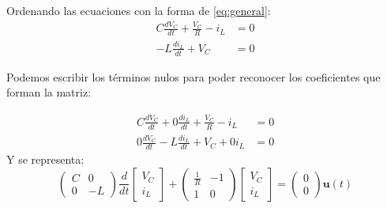 \documentclass[10pt,a4paper]{article} %
\begin{document}
	Ordenando las ecuaciones con la forma de \ref{eq:general}:
	\begin{align}
	C\frac{dV_C}{dt}+\frac{V_C}{R}-i_L&=0\\
	-L\frac{di_L}{dt}+V_C&=0		
	\end{align}
	
	Podemos escribir los términos nulos para poder reconocer los coeficientes que forman la matriz:
	
	\begin{align}
	C\frac{dV_C}{dt}+0\frac{di_L}{dt}+\frac{V_C}{R}-i_L&=0\\
	0\frac{dV_C}{dt}-L\frac{di_L}{dt}+V_C+0i_L&=0		
	\end{align}
	Y se representa:
	\begin{equation}
	\begin{pmatrix}
	C&0\\
	0&-L
	\end{pmatrix}\frac{d}{dt}\begin{bmatrix}
	V_C\\
	i_L
	\end{bmatrix}+\begin{pmatrix}
	\frac{1}{R} & -1\\
	1&0
	\end{pmatrix}\begin{bmatrix}
	V_C\\
	i_L
	\end{bmatrix}=\begin{pmatrix}
	0\\
	0
	\end{pmatrix}\textbf{u}(t)
	\end{equation}
	
%	
%	
	
\end{document}
